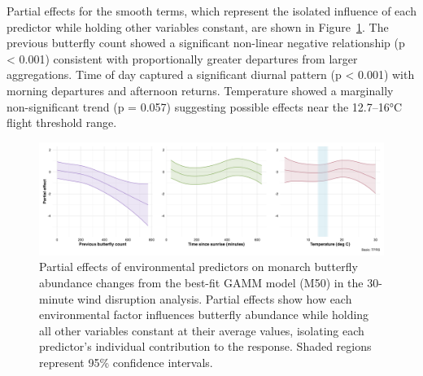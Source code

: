 

Partial effects for the smooth terms, which represent the isolated influence of each predictor while holding other variables constant, are shown in Figure~\ref{fig:partial_effects_30min}. The previous butterfly count showed a significant non-linear negative relationship (p < 0.001) consistent with proportionally greater departures from larger aggregations. Time of day captured a significant diurnal pattern (p < 0.001) with morning departures and afternoon returns. Temperature showed a marginally non-significant trend (p = 0.057) suggesting possible effects near the 12.7–16°C flight threshold range.

\begin{figure}[htbp]
    \centering
    \includegraphics[width=\textwidth]{supplemental/results/30_min/figures/partial_effects_best_1x3.png}
    \caption{Partial effects of environmental predictors on monarch butterfly abundance changes from the best-fit GAMM model (M50) in the 30-minute wind disruption analysis. Partial effects show how each environmental factor influences butterfly abundance while holding all other variables constant at their average values, isolating each predictor's individual contribution to the response. Shaded regions represent 95\% confidence intervals.}
    \label{fig:partial_effects_30min}
\end{figure}

